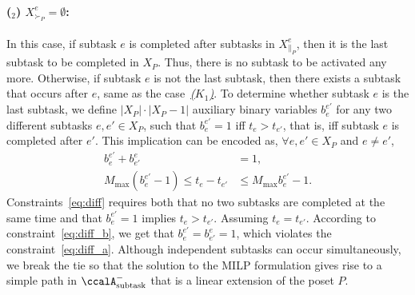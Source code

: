 \documentclass[Afour,sageh,times]{sagej}
\newcounter{mycounter}
\newcommand{\auto}[1]{\ccalA_{\textup{#1}}}
\begin{document}
{{{{\paragraph{($_2$) $ X^e_{\succ_{P}} = \emptyset$:}\label{activation:b} In this case, if subtask $e$ is completed after  subtasks in  $X_{\|_P}^e$, then it is the last  subtask  to be completed in  $X_P$. Thus, there is no subtask to be activated any more. Otherwise, if subtask $e$ is not the last subtask, then there exists a subtask that occurs after $e$, same as the case~\hyperref[activation:a]{\it ($K_1$)}. To determine whether subtask $e$ is the last subtask, we define $|X_P|\cdot |X_P -1|$ auxiliary binary variables $b_{e}^{e'}$ for any two different subtasks  $e, e' \in X_P$,  such that $b_{e}^{e'}=1$  iff $t_{e} > t_{e'}$, that is, iff subtask $e$ is completed after $e'$. This implication can be encoded as, $\forall e, e' \in X_P $ and $e\neq e'$,
\begingroup\makeatletter\def\f@size{10}\check@mathfonts
\def\maketag@@@#1{\hbox{\m@th\normalsize\normalfont#1}}%
\begin{subequations}\label{eq:diff}
  \begin{align}
    b_e^{e'} + b_{e'}^e &  = 1, \label{eq:diff_a}\\
  M_{\text{max}} (b_{e}^{e'} - 1) \leq t_e -  t_{e'} & \leq M_{\text{max}} b_{e}^{e'} - 1. \label{eq:diff_b}
\end{align}
\end{subequations}
\endgroup
Constraints~\eqref{eq:diff} requires both that  no two subtasks are completed at the same time and that $b_e^{e'}=1$ implies $t_e > t_{e'}$. Assuming $t_e = t_{e'}$. According to constraint~\eqref{eq:diff_b}, we get that $b_e^{e'}=b_{e'}^{e}=1$, which violates the constraint~\eqref{eq:diff_a}. Although independent subtasks can occur simultaneously, we break the tie so that the solution to the MILP formulation gives rise to a simple path in $\auto{subtask}^-$ that is a linear extension of the poset $P$.%


}}}}
\end{document}
